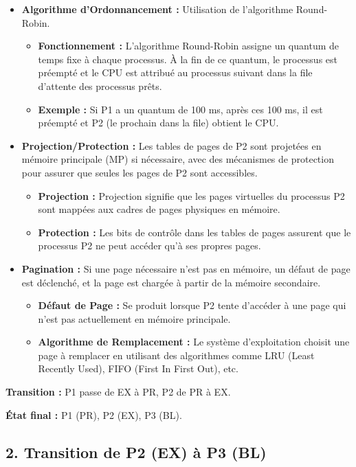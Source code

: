 \begin{itemize}
    \item \textbf{Algorithme d'Ordonnancement :} Utilisation de l'algorithme Round-Robin.
    \begin{itemize}
        \item \textbf{Fonctionnement :} L'algorithme Round-Robin assigne un quantum de temps fixe à chaque processus. À la fin de ce quantum, le processus est préempté et le CPU est attribué au processus suivant dans la file d'attente des processus prêts.
        \item \textbf{Exemple :} Si P1 a un quantum de 100 ms, après ces 100 ms, il est préempté et P2 (le prochain dans la file) obtient le CPU.
    \end{itemize}
    \item \textbf{Projection/Protection :} Les tables de pages de P2 sont projetées en mémoire principale (MP) si nécessaire, avec des mécanismes de protection pour assurer que seules les pages de P2 sont accessibles.
    \begin{itemize}
        \item \textbf{Projection :} Projection signifie que les pages virtuelles du processus P2 sont mappées aux cadres de pages physiques en mémoire.
        \item \textbf{Protection :} Les bits de contrôle dans les tables de pages assurent que le processus P2 ne peut accéder qu'à ses propres pages.
    \end{itemize}
    \item \textbf{Pagination :} Si une page nécessaire n'est pas en mémoire, un défaut de page est déclenché, et la page est chargée à partir de la mémoire secondaire.
    \begin{itemize}
        \item \textbf{Défaut de Page :} Se produit lorsque P2 tente d'accéder à une page qui n'est pas actuellement en mémoire principale.
        \item \textbf{Algorithme de Remplacement :} Le système d'exploitation choisit une page à remplacer en utilisant des algorithmes comme LRU (Least Recently Used), FIFO (First In First Out), etc.
    \end{itemize}
\end{itemize}

\textbf{Transition :} P1 passe de EX à PR, P2 de PR à EX.

\textbf{État final :} P1 (PR), P2 (EX), P3 (BL).

\subsection*{2. Transition de P2 (EX) à P3 (BL)}

